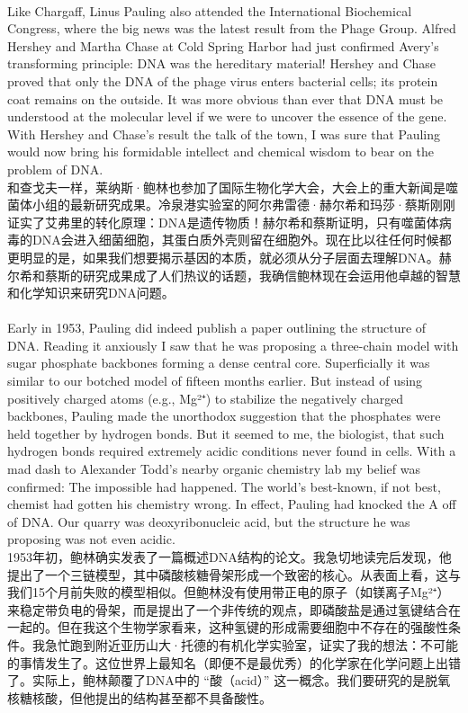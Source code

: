 \documentclass{article}
\begin{document}
\\
Like Chargaff, Linus Pauling also attended the International Biochemical Congress, where the big news was the latest result from the Phage Group. Alfred Hershey and Martha Chase at Cold Spring Harbor had just confirmed Avery’s transforming principle: DNA was the hereditary material! Hershey and Chase proved that only the DNA of the phage virus enters bacterial cells; its protein coat remains on the outside. It was more obvious than ever that DNA must be understood at the molecular level if we were to uncover the essence of the gene. With Hershey and Chase’s result the talk of the town, I was sure that Pauling would now bring his formidable intellect and chemical wisdom to bear on the problem of DNA.\\
和查戈夫一样，莱纳斯·鲍林也参加了国际生物化学大会，大会上的重大新闻是噬菌体小组的最新研究成果。冷泉港实验室的阿尔弗雷德·赫尔希和玛莎·蔡斯刚刚证实了艾弗里的转化原理：DNA是遗传物质！赫尔希和蔡斯证明，只有噬菌体病毒的DNA会进入细菌细胞，其蛋白质外壳则留在细胞外。现在比以往任何时候都更明显的是，如果我们想要揭示基因的本质，就必须从分子层面去理解DNA。赫尔希和蔡斯的研究成果成了人们热议的话题，我确信鲍林现在会运用他卓越的智慧和化学知识来研究DNA问题。\\

\\
Early in 1953, Pauling did indeed publish a paper outlining the structure of DNA. Reading it anxiously I saw that he was proposing a three-chain model with sugar phosphate backbones forming a dense central core. Superficially it was similar to our botched model of fifteen months earlier. But instead of using positively charged atoms (e.g., Mg²⁺) to stabilize the negatively charged backbones, Pauling made the unorthodox suggestion that the phosphates were held together by hydrogen bonds. But it seemed to me, the biologist, that such hydrogen bonds required extremely acidic conditions never found in cells. With a mad dash to Alexander Todd’s nearby organic chemistry lab my belief was confirmed: The impossible had happened. The world’s best-known, if not best, chemist had gotten his chemistry wrong. In effect, Pauling had knocked the A off of DNA. Our quarry was deoxyribonucleic acid, but the structure he was proposing was not even acidic.\\
1953年初，鲍林确实发表了一篇概述DNA结构的论文。我急切地读完后发现，他提出了一个三链模型，其中磷酸核糖骨架形成一个致密的核心。从表面上看，这与我们15个月前失败的模型相似。但鲍林没有使用带正电的原子（如镁离子Mg²⁺）来稳定带负电的骨架，而是提出了一个非传统的观点，即磷酸盐是通过氢键结合在一起的。但在我这个生物学家看来，这种氢键的形成需要细胞中不存在的强酸性条件。我急忙跑到附近亚历山大·托德的有机化学实验室，证实了我的想法：不可能的事情发生了。这位世界上最知名（即便不是最优秀）的化学家在化学问题上出错了。实际上，鲍林颠覆了DNA中的 “酸（acid）” 这一概念。我们要研究的是脱氧核糖核酸，但他提出的结构甚至都不具备酸性。\\
\end{document}
